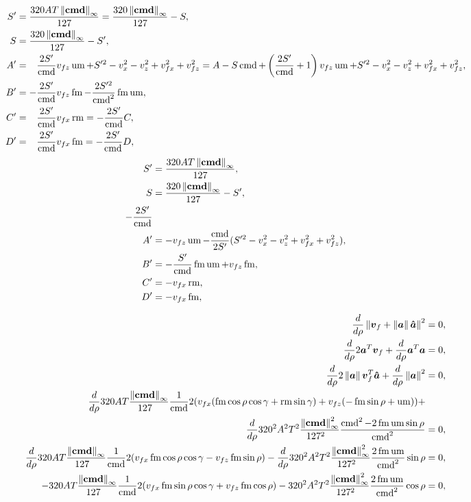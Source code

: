 \begin{align*}
S' &= \frac{320AT\left\lVert\boldsymbol{\operatorname{cmd}}\right\rVert_{\infty}}{127} = \frac{320\left\lVert\boldsymbol{\operatorname{cmd}}\right\rVert_{\infty}}{127} - S,\\
S &= \frac{320\left\lVert\boldsymbol{\operatorname{cmd}}\right\rVert_{\infty}}{127} - S',\\
A' &= \hphantom{-}\frac{2S'}{\operatorname{cmd}}v_{fz}\operatorname{um} + S'^2 - v_x^2 - v_z^2 + v_{fx}^2 + v_{fz}^2 = A - S\operatorname{cmd} + \left(\frac{2S'}{\operatorname{cmd}} + 1\right)v_{fz}\operatorname{um} + S'^2 - v_x^2 - v_z^2 + v_{fx}^2 + v_{fz}^2,\\
B' &= -\frac{2S'}{\operatorname{cmd}}v_{fz}\operatorname{fm} - \frac{2S'^2}{\operatorname{cmd}^2}\operatorname{fm}\operatorname{um},\\
C' &= \hphantom{-}\frac{2S'}{\operatorname{cmd}}v_{fx}\operatorname{rm} = -\frac{2S'}{\operatorname{cmd}}C,\\
D' &= \hphantom{-}\frac{2S'}{\operatorname{cmd}}v_{fx}\operatorname{fm} = -\frac{2S'}{\operatorname{cmd}}D,
\end{align*}
\begin{align*}
S' &= \frac{320AT\left\lVert\boldsymbol{\operatorname{cmd}}\right\rVert_{\infty}}{127},\\
S &= \frac{320\left\lVert\boldsymbol{\operatorname{cmd}}\right\rVert_{\infty}}{127} - S',\\
-\frac{2S'}{\operatorname{cmd}}\\
A' &= -v_{fz}\operatorname{um} - \frac{\operatorname{cmd}}{2S'}(S'^2 - v_x^2 - v_z^2 + v_{fx}^2 + v_{fz}^2),\\
B' &= -\frac{S'}{\operatorname{cmd}}\operatorname{fm}\operatorname{um} + v_{fz}\operatorname{fm},\\
C' &= -v_{fx}\operatorname{rm},\\
D' &= -v_{fx}\operatorname{fm},
\end{align*}

\begin{align*}
\frac{d}{d\rho}\norm{\vec{v}_f + \norm{\vec{a}}\uvec{a}}^2 &= 0,\\
\frac{d}{d\rho}2\vec{a}^T \vec{v}_f + \frac{d}{d\rho}\vec{a}^T \vec{a} &= 0,\\
\frac{d}{d\rho}2\norm{\vec{a}} \vec{v}_f^T \uvec{a} + \frac{d}{d\rho}\norm{\vec{a}}^2 &= 0,\\
\frac{d}{d\rho}320AT\frac{\norm{\vec{\cmd}}_{\infty}}{127\hphantom{_{\infty}}} \frac{1}{\cmd}2 (v_{fx}(\fmove \cos\rho\cos\gamma + \rmove \sin\gamma) + v_{fz}(-\fmove \sin\rho + \umove) ) +\\
\frac{d}{d\rho}320^2 A^2 T^2\frac{\norm{\vec{\cmd}}^2_{\infty}}{127^2\hphantom{_{\infty}}} \frac{\cmd^2  - 2\fmove\umove\sin\rho}{\cmd^2} &= 0,\\
%
\frac{d}{d\rho}320AT\frac{\norm{\vec{\cmd}}_{\infty}}{127\hphantom{_{\infty}}} \frac{1}{\cmd}2 (v_{fx}\fmove \cos\rho\cos\gamma - v_{fz}\fmove \sin\rho ) - \frac{d}{d\rho}320^2 A^2 T^2\frac{\norm{\vec{\cmd}}^2_{\infty}}{127^2\hphantom{_{\infty}}} \frac{2\fmove\umove}{\cmd^2}\sin\rho &= 0,\\
-320AT\frac{\norm{\vec{\cmd}}_{\infty}}{127\hphantom{_{\infty}}} \frac{1}{\cmd}2 (v_{fx}\fmove \sin\rho\cos\gamma + v_{fz}\fmove \cos\rho ) - 320^2 A^2 T^2\frac{\norm{\vec{\cmd}}^2_{\infty}}{127^2\hphantom{_{\infty}}} \frac{2\fmove\umove}{\cmd^2}\cos\rho &= 0,
\end{align*}

